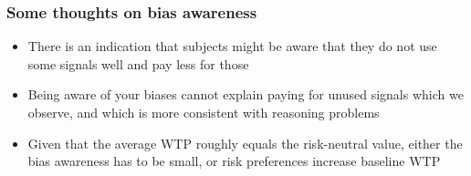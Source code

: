 \documentclass[11pt,hyperref={bookmarks=false}]{beamer}
\begin{document}
\begin{frame}
\frametitle{Some thoughts on bias awareness}
\begin{itemize}
\item There is an indication that subjects might be aware that they do not use some signals well and pay less for those
\item Being aware of your biases cannot explain paying for unused signals which we observe, and which is more consistent with reasoning problems
\item Given that the average WTP roughly equals the risk-neutral value, either the bias awareness has to be small, or risk preferences increase baseline WTP
\end{itemize}
\end{frame}
\end{document}
